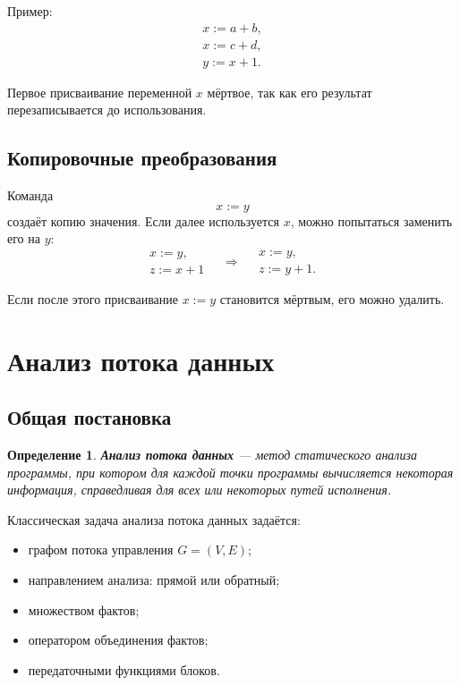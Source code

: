 \documentclass[12pt,a4paper]{article}
\newtheorem{definition}{Определение}
\begin{document}
Пример:
\[
\begin{array}{l}
x := a + b,\\
x := c + d,\\
y := x + 1.
\end{array}
\]

Первое присваивание переменной $x$ мёртвое, так как его результат перезаписывается до использования.

\subsection{Копировочные преобразования}

Команда
\[
x := y
\]
создаёт копию значения. Если далее используется $x$, можно попытаться заменить его на $y$:
\[
\begin{array}{l}
x := y,\\
z := x + 1
\end{array}
\quad \Longrightarrow \quad
\begin{array}{l}
x := y,\\
z := y + 1.
\end{array}
\]

Если после этого присваивание $x := y$ становится мёртвым, его можно удалить.

\section{Анализ потока данных}

\subsection{Общая постановка}

\begin{definition}
\textbf{Анализ потока данных} --- метод статического анализа программы, при котором для каждой точки программы вычисляется некоторая информация, справедливая для всех или некоторых путей исполнения.
\end{definition}

Классическая задача анализа потока данных задаётся:
\begin{itemize}
    \item графом потока управления $G=(V,E)$;
    \item направлением анализа: прямой или обратный;
    \item множеством фактов;
    \item оператором объединения фактов;
    \item передаточными функциями блоков.
\end{itemize}
\end{document}
